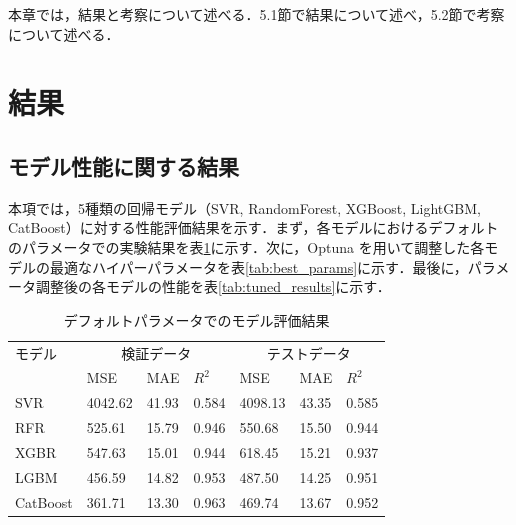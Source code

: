 本章では，結果と考察について述べる．5.1節で結果について述べ，5.2節で考察について述べる．

\section{結果}

\subsection{モデル性能に関する結果}
本項では，5種類の回帰モデル（SVR, RandomForest, XGBoost, LightGBM, CatBoost）に対する性能評価結果を示す．まず，各モデルにおけるデフォルトのパラメータでの実験結果を表\ref{tab:default_results}に示す．次に，Optuna を用いて調整した各モデルの最適なハイパーパラメータを表\ref{tab:best_params}に示す．最後に，パラメータ調整後の各モデルの性能を表\ref{tab:tuned_results}に示す．
\begin{table}[htbp]
    \centering
    \caption{デフォルトパラメータでのモデル評価結果}
    \label{tab:default_results}
    \begin{tabular}{l|p{0.8cm}p{0.8cm}p{0.8cm}|p{0.8cm}p{0.8cm}p{0.8cm}}
        \hline\hline\hline
        モデル & \multicolumn{3}{c|}{検証データ} & \multicolumn{3}{c}{テストデータ} \\
               & MSE & MAE & $R^2$ & MSE & MAE & $R^2$ \\
        \hline
        SVR       & 4042.62 & 41.93 & 0.584 & 4098.13 & 43.35 & 0.585 \\
        RFR       & 525.61  & 15.79 & 0.946 & 550.68  & 15.50 & 0.944 \\
        XGBR      & 547.63  & 15.01 & 0.944 & 618.45  & 15.21 & 0.937 \\
        LGBM      & 456.59  & 14.82 & 0.953 & 487.50  & 14.25 & 0.951 \\
        CatBoost  & 361.71  & 13.30 & 0.963 & 469.74  & 13.67 & 0.952 \\
        \hline\hline\hline
    \end{tabular}
\end{table}

